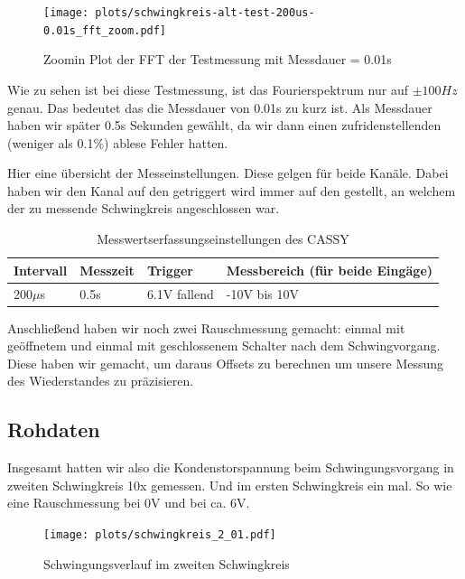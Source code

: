 \documentclass[twoside]{protokoll}
\begin{document}
\begin{figure}[H]
    \centering
    \texttt{[image: plots/schwingkreis-alt-test-200us-0.01s\_fft\_zoom.pdf]}
    \caption{Zoomin Plot der FFT der Testmessung mit Messdauer = 0.01s}
\end{figure}
Wie zu sehen ist bei diese Testmessung, ist das Fourierspektrum nur auf $ \pm 100Hz $ genau. Das bedeutet das die Messdauer von 0.01s zu kurz ist.
Als Messdauer haben wir später 0.5s Sekunden gewählt, da wir dann einen zufridenstellenden (weniger als 0.1\%) ablese Fehler hatten.

Hier eine übersicht der Messeinstellungen. Diese gelgen für beide Kanäle. 
Dabei haben wir den Kanal auf den getriggert wird immer auf den gestellt, an welchem der zu messende Schwingkreis angeschlossen war.
\begin{table}[H]
    \centering
    \begin{tabularx}{1\textwidth}{X X X X} %
        \toprule
        \textbf{Intervall} & \textbf{Messzeit} & \textbf{Trigger} & \textbf{Messbereich (für beide Eingäge)} \\
        \midrule
        200$\mu$s  & 0.5s & 6.1V fallend & -10V bis 10V \\
        \bottomrule
    \end{tabularx}
    \caption{Messwertserfassungseinstellungen des CASSY}
    \label{tab:mytable}
\end{table}
     
Anschließend haben wir noch zwei Rauschmessung gemacht: einmal mit geöffnetem und einmal mit geschlossenem Schalter nach dem Schwingvorgang.
Diese haben wir gemacht, um daraus Offsets zu berechnen um unsere Messung des Wiederstandes zu präzisieren.


\subsection{Rohdaten}

Insgesamt hatten wir also die Kondenstorspannung beim Schwingungsvorgang in zweiten Schwingkreis 10x gemessen. Und im ersten Schwingkreis ein mal. 
So wie eine Rauschmessung bei 0V und bei ca. 6V. 

\begin{figure}[H]
    \centering
    \texttt{[image: plots/schwingkreis\_2\_01.pdf]}
    \caption{Schwingungsverlauf im zweiten Schwingkreis}
\end{figure}
\end{document}
